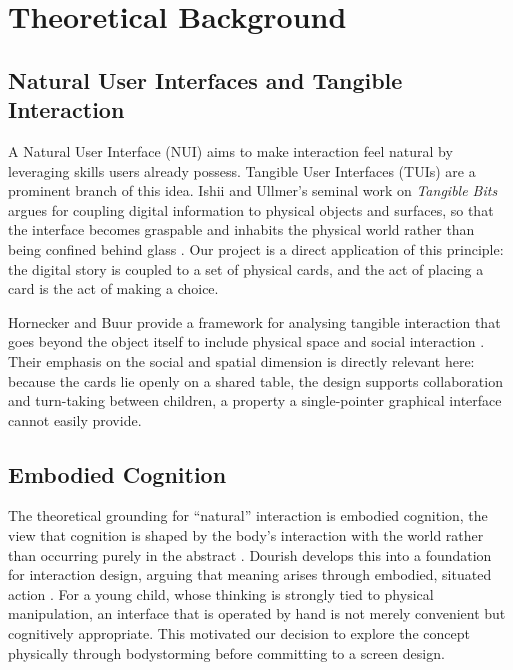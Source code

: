 \section{Theoretical Background}

\subsection{Natural User Interfaces and Tangible Interaction}
A Natural User Interface (NUI) aims to make interaction feel natural by
leveraging skills users already possess. Tangible User Interfaces (TUIs) are
a prominent branch of this idea. Ishii and Ullmer's seminal work on
\emph{Tangible Bits} argues for coupling digital information to physical
objects and surfaces, so that the interface becomes graspable and inhabits
the physical world rather than being confined behind glass
\cite{ishii1997tangible}. Our project is a direct application of this
principle: the digital story is coupled to a set of physical cards, and the
act of placing a card is the act of making a choice.

Hornecker and Buur provide a framework for analysing tangible interaction
that goes beyond the object itself to include physical space and social
interaction \cite{hornecker2006getting}. Their emphasis on the social and
spatial dimension is directly relevant here: because the cards lie openly on
a shared table, the design supports collaboration and turn-taking between
children, a property a single-pointer graphical interface cannot easily
provide.

\subsection{Embodied Cognition}
The theoretical grounding for ``natural'' interaction is embodied cognition,
the view that cognition is shaped by the body's interaction with the world
rather than occurring purely in the abstract \cite{wilson2002six}. Dourish
develops this into a foundation for interaction design, arguing that meaning
arises through embodied, situated action \cite{dourish2001where}. For a young
child, whose thinking is strongly tied to physical manipulation, an interface
that is operated by hand is not merely convenient but cognitively
appropriate. This motivated our decision to explore the concept physically
through bodystorming before committing to a screen design.

